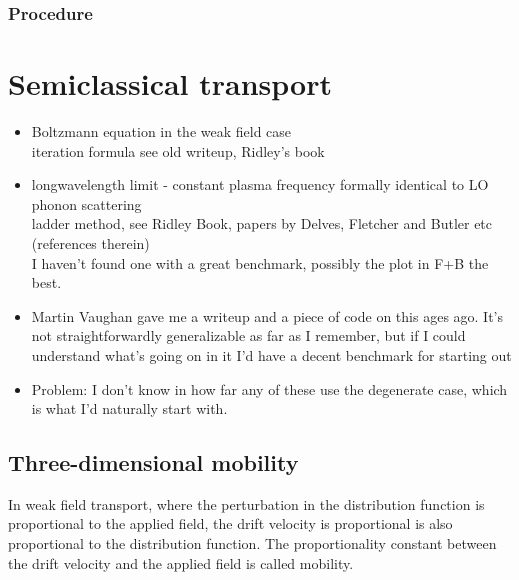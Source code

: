 \documentclass[physics,phd,nolot,nolof]{uccthesis}%
\begin{document}
{\subsubsection{Procedure}

\clearpage
\section{Semiclassical transport}
\begin{itemize}
  \item Boltzmann equation in the weak field case\\
    iteration formula see old writeup, Ridley's book 
  \item longwavelength limit - constant plasma frequency
   formally identical to LO phonon scattering\\
   ladder method, see Ridley Book, papers by Delves, Fletcher and Butler 
   etc (references therein)\\
   I haven't found one with a great benchmark, possibly the plot in F+B the best.
 \item Martin Vaughan gave me a writeup and a piece of code on this ages ago. 
   It's not straightforwardly generalizable as far as I remember, but if I 
   could understand what's going on in it I'd have a decent benchmark for 
   starting out
 \item Problem: I don't know in how far any of these use the degenerate case, which
   is what I'd naturally start with.
   \end{itemize}

\subsection{Three-dimensional mobility}
\label{sec:3d-mobility}
In weak field transport, where the perturbation in the distribution function
is proportional to the applied field, the drift velocity is proportional is 
also proportional to the distribution function. 
The proportionality constant between the drift velocity and the applied field is called mobility.

}
\end{document}
